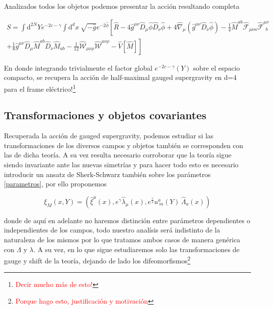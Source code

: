 \documentclass{article}
\numberwithin{equation}{section}
\begin{document}
Analizados todos los objetos podemos presentar la acción resultando completa\\


\begin{boxeq}
	\begin{equation}\label{Sgsugra}
	\begin{aligned}
	S = \int \mathrm{d}^{2N} Y e^{-2c - \gamma} \int \mathrm{d}^d x \  \sqrt{-\hat{g}}e^{-2 \hat{\phi}} \left[ \hat{R} -4\hat{g}^{\mu \nu} \hat{D}_{\mu} \hat{\phi} \hat{D}_{\nu} \hat{\phi} + 4 \hat{\nabla}_{\mu} \left(\hat{g}^{\mu \nu} \hat{D}_{\nu} \hat{\phi}\right) - \frac{1}{4} \hat{M}^{a b} \hat{\mathcal{F}}_{\mu \nu a} \hat{\mathcal{F}}^{\mu \nu}_{\ \ b} \right.\\
	\left. + \frac{1}{8} \hat{g}^{\mu \nu} \hat{D}_{\mu} \hat{M}^{a b} \hat{D}_{\nu} \hat{M}_{a b}  - \frac{1}{12}\hat{\mathcal{W}}_{\mu \nu \rho}\hat{\mathcal{W}}^{\mu \nu \rho} - \hat{V}[\hat{M}] \right]
	\end{aligned}
	\end{equation}
\end{boxeq}

\vspace{.5cm}

En donde integrando trivialmente el factor global $ e^{-2c - \gamma} (Y) $ sobre el espacio compacto, se recupera la acción de half-maximal gauged supergravity en d=4 para el frame eléctrico!\footnote{\textcolor{red}{Decir mucho más de esto!}}

\subsection{Transformaciones y objetos covariantes}

Recuperada la acción de gauged supergravity, podemos estudiar si las transformaciones de los diversos campos y objetos también se corresponden con las de dicha teoría. A su vez resulta necesario corroborar que la teoría sigue siendo invariante ante las nuevas simetrías y para hacer todo esto es necesario introducir un ansatz de Sherk-Schwarz también sobre los parámetros \ref{parametros}, por ello proponemos

\begin{equation}\label{hatparametros}
\xi_M(x,Y)=(\hat{\xi}^{\mu}(x), e^{\gamma} \hat{\lambda}_{\mu}(x), e^{\frac{\gamma}{2}} u^{a}_{\ m}(Y)\ \hat{\Lambda}_a(x))
\end{equation}

donde de aquí en adelante no haremos distinción entre parámetros dependientes o independientes de los campos, todo nuestro analísis será indistinto de la naturaleza de los mismos por lo que tratamos ambos casos de manera genérica con $ \Lambda $ y $ \lambda $. A su vez, en lo que sigue estudiaremos solo las transformaciones de gauge y shift de la teoría, dejando de lado los difeomorfismos\footnote{\textcolor{red}{Porque hago esto, justificación y motivación}}
\end{document}
